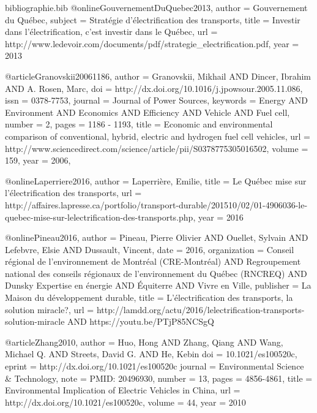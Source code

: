 \begin{filecontents}{bibliographie.bib}
    @online{GouvernementDuQuebec2013,
        author  = {Gouvernement du Québec},
        subject = {Stratégie d’électrification des transports},
        title   = {Investir dans l’électrification, c’est investir dans le Québec},
        url     = {http://www.ledevoir.com/documents/pdf/strategie_electrification.pdf},
        year    = {2013}
    }

    @article{Granovskii20061186,
        author   = {Granovskii, Mikhail AND Dincer, Ibrahim AND A. Rosen, Marc},
        doi      = {http://dx.doi.org/10.1016/j.jpowsour.2005.11.086},
        issn     = {0378-7753},
        journal  = {Journal of Power Sources},
        keywords = {Energy AND Environment AND Economics AND Efficiency AND Vehicle AND Fuel cell},
        number   = {2},
        pages    = {1186 - 1193},
        title    = {Economic and environmental comparison of conventional, hybrid, electric and hydrogen fuel cell vehicles},
        url      = {http://www.sciencedirect.com/science/article/pii/S0378775305016502},
        volume   = {159},
        year     = {2006},
    }

    @online{Laperriere2016,
        author = {Laperrière, Emilie},
        title  = {Le Québec mise sur l'électrification des transports},
        url    = {http://affaires.lapresse.ca/portfolio/transport-durable/201510/02/01-4906036-le-quebec-mise-sur-lelectrification-des-transports.php},
        year   = {2016}
    }

    @online{Pineau2016,
        author       = {Pineau, Pierre Olivier AND Ouellet, Sylvain AND Lefebvre, Elsie AND Dussault, Vincent},
        date         = {2016},
        organization = {Conseil régional de l’environnement de Montréal (CRE-Montréal) AND Regroupement national des conseils régionaux de l’environnement du Québec (RNCREQ) AND Dunsky Expertise en énergie AND Équiterre AND Vivre en Ville},
        publisher    = {La Maison du développement durable},
        title        = {L'électrification des transports, la solution miracle?},
        url          = {http://lamdd.org/actu/2016/lelectrification-transports-solution-miracle AND https://youtu.be/PTjP85NCSgQ}
    }

    @article{Zhang2010,
        author  = {Huo, Hong AND Zhang, Qiang AND Wang, Michael Q. AND Streets, David G. AND He, Kebin}
        doi     = {10.1021/es100520c},
        eprint  = {http://dx.doi.org/10.1021/es100520c}
        journal = {Environmental Science \& Technology},
        note    = {PMID: 20496930},
        number  = {13},
        pages   = {4856-4861},
        title   = {Environmental Implication of Electric Vehicles in China},
        url     = {http://dx.doi.org/10.1021/es100520c},
        volume  = {44},
        year    = {2010}
    }
\end{filecontents}
